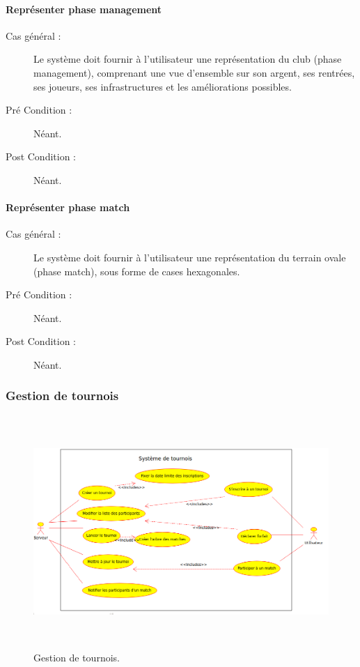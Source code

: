 \documentclass[a4paper]{article}
\begin{document}
\paragraph{Représenter phase management}
\begin{description}
\item[Cas général :] Le système doit fournir à l'\gls{utilisateur} une représentation du \gls{club} (phase management), comprenant une vue d'ensemble sur son argent, ses rentrées, ses \glspl{joueur}, ses infrastructures et les améliorations possibles.
\item[Pré Condition  :] Néant.
\item[Post Condition :] Néant.
\end{description}

\paragraph{Représenter phase match}
\begin{description}
\item[Cas général :] Le système doit fournir à l'\gls{utilisateur} une représentation du terrain ovale (phase match), sous forme de cases hexagonales.
\item[Pré Condition  :] Néant.
\item[Post Condition :] Néant.
\end{description}

\subsubsection{Gestion de tournois}
\begin{figure}[h]
   \caption{\label{1} Gestion de tournois.}
   \begin{center}
   \includegraphics[height=250pt]{uml/servTournoi.png}
   \end{center}
\end{figure}
\end{document}

